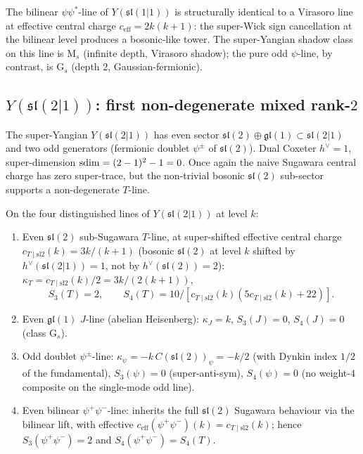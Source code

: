 \begin{remark}
\label{rem:sl11-bilinear-class-M}
The bilinear $\psi\psi^\ast$-line of $Y(\mathfrak{sl}(1|1))$ is
structurally identical to a Virasoro line at effective central charge
$c_{\mathrm{eff}} = 2 k(k+1)$: the super-Wick sign cancellation at
the bilinear level produces a bosonic-like tower. The super-Yangian
shadow class on this line is M$_s$ (infinite depth, Virasoro
shadow); the pure odd $\psi$-line, by contrast, is G$_s$ (depth $2$,
Gaussian-fermionic).
\end{remark}

\subsection{\texorpdfstring{$Y(\mathfrak{sl}(2|1))$}{Y(sl(2|1))}: first non-degenerate mixed rank-\texorpdfstring{$2$}{2}}
\label{sec:sl21-closed-form}

The super-Yangian $Y(\mathfrak{sl}(2|1))$ has even sector
$\mathfrak{sl}(2) \oplus \mathfrak{gl}(1) \subset \mathfrak{sl}(2|1)$
and two odd generators (fermionic doublet $\psi^\pm$ of
$\mathfrak{sl}(2)$). Dual Coxeter $h^\vee = 1$, super-dimension
$\mathrm{sdim} = (2 - 1)^2 - 1 = 0$. Once again the naive Sugawara central
charge has zero super-trace, but the non-trivial bosonic $\mathfrak{sl}(2)$
sub-sector supports a non-degenerate $T$-line.

\begin{theorem}
\label{thm:sl21-closed-forms}
On the four distinguished lines of $Y(\mathfrak{sl}(2|1))$ at level $k$:
\begin{enumerate}[label=\textup{(\alph*)},nosep]
\item Even $\mathfrak{sl}(2)$ sub-Sugawara $T$-line, at
 super-shifted effective central charge
 $c_{T \mid \mathrm{sl2}}(k) = 3k/(k+1)$ (bosonic $\mathfrak{sl}(2)$
 at level $k$ shifted by $h^\vee(\mathfrak{sl}(2|1)) = 1$, not by
 $h^\vee(\mathfrak{sl}(2)) = 2$):
 $\kappa_T = c_{T \mid \mathrm{sl2}}(k)/2 = 3k/(2(k+1))$,
\[
 S_3(T) = 2,
 \qquad
 S_4(T) = 10/[c_{T \mid \mathrm{sl2}}(k) (5 c_{T \mid \mathrm{sl2}}(k) + 22)].
\]
\item Even $\mathfrak{gl}(1)$ $J$-line (abelian Heisenberg):
 $\kappa_J = k$, $S_3(J) = 0$, $S_4(J) = 0$ (class G$_s$).
\item Odd doublet $\psi^\pm$-line: $\kappa_\psi = -k \, C(\mathfrak{sl}(2))_\psi
 = -k/2$ (with Dynkin index $1/2$ of the fundamental), $S_3(\psi) = 0$
 (super-anti-sym), $S_4(\psi) = 0$ (no weight-$4$ composite on the
 single-mode odd line).
\item Even bilinear $\psi^+ \psi^-$-line: inherits the full $\mathfrak{sl}(2)$
 Sugawara behaviour via the bilinear lift, with effective
 $c_{\mathrm{eff}}(\psi^+\psi^-)(k) = c_{T \mid \mathrm{sl2}}(k)$; hence
 $S_3(\psi^+ \psi^-) = 2$ and $S_4(\psi^+ \psi^-) = S_4(T)$.
\end{enumerate}
\end{theorem}

